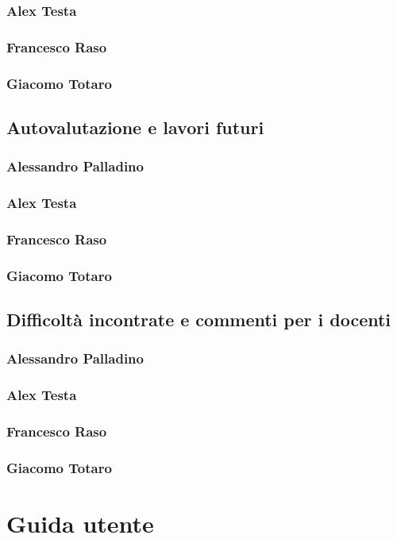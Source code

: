 \documentclass[a4paper,12pt]{report}
\begin{document}
    
    \subsection*{Alex Testa}
    
    
    \subsection*{Francesco Raso}
    
    
    \subsection*{Giacomo Totaro}
    
    
\section{Autovalutazione e lavori futuri}
    \subsection*{Alessandro Palladino}
    
    
    \subsection*{Alex Testa}
    
    
    \subsection*{Francesco Raso}
    
    
    \subsection*{Giacomo Totaro}
    
    
\section{Difficoltà incontrate e commenti per i docenti}
    \subsection*{Alessandro Palladino}
    
    
    \subsection*{Alex Testa}
    
    
    \subsection*{Francesco Raso}
    
    
    \subsection*{Giacomo Totaro}
    
    

\appendix
\chapter{Guida utente} 
\end{document}
